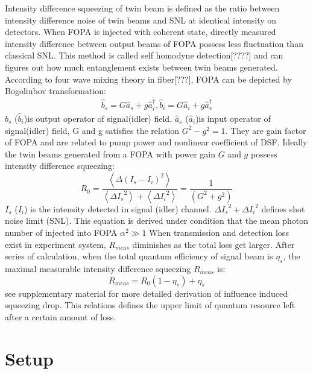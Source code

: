 \documentclass[9pt,twocolumn,twoside]{osajnl}
\begin{document}
Intensity difference squeezing of twin beam is defined as the ratio between intensity difference noise of twin beams and SNL at identical intensity on detectors. When FOPA is injected with coherent state, directly measured intensity difference between output beams of FOPA possess less fluctuation than classical SNL. This method is called self homodyne detection[????] and can figures out how much entanglement exists between twin beams generated.
According to four wave mixing theory in fiber\cite{guo13}[???], FOPA can be depicted by Bogoliubov transformation:
\begin{equation}
\begin{array}{c}
\hat b_s = G{\hat a_s} + g\hat a_i^\dag ,
\hat b_i = G{\hat a_i} + g\hat a_s^\dag
\end{array}
\end{equation}
$\hat b_s$ ($\hat b_i$)is output operator of signal(idler) field, $\hat a_s$ ($\hat a_i$)is input operator of signal(idler) field, G and g satisfies the relation $G^2-g^2=1$. They are gain factor of FOPA and are related to pump power and nonlinear coefficient of DSF.
Ideally the twin beams generated from a FOPA with power gain $G$ and $g$ possess intensity difference squeezing:
\begin{equation}
{R_0} = \frac{
{\left\langle {\Delta {{({I_s} - {I_i})}^2}} \right\rangle }}
{{\left\langle {\Delta {I_s}^2} \right\rangle  + \left\langle {\Delta {I_i}^2} \right\rangle }} = \frac{1}{{({G^2} + {g^2})}}
\label{eq:R0}
\end{equation}
$I_s$ ($I_i$) is the intensity detected in signal (idler) channel. $\Delta{I_s}^2+\Delta{I_i}^2$ defines shot noise limit (SNL). This equation is derived under condition that the mean photon number of injected into FOPA $\alpha^2\gg 1$ 
When transmission and detection loss exist in experiment system, $R_{meas}$ diminishes as the total loss get larger.
After series of calculation, when the total quantum efficiency of signal beam is $\eta_s$, the maximal measurable intensity difference squeezing $R_{meas}$ is:
\begin{equation}
R_{meas}=R_0(1-\eta_s)+\eta_s
\label{eq:loss}
\end{equation}see supplementary material for more detailed derivation of influence induced squeezing drop.
This relations defines the upper limit of quantum resource left after a certain amount of loss.



\section{Setup}
\end{document}
